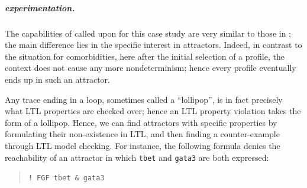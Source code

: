 \subparagraph*{\GROOVE experimentation.}

The capabilities of \GROOVE called upon for this case study are very similar to those in ; the main difference lies in the specific interest in attractors. Indeed, in contrast to the situation for comorbidities, here after the initial selection of a profile, the context does not cause any more nondeterminism; hence every profile eventually ends up in such an attractor.

Any trace ending in a loop, sometimes called a ``lollipop'', is in fact precisely what LTL properties are checked over; hence an LTL property violation takes the form of a lollipop. Hence, we can find attractors with specific properties by formulating their non-existence in LTL, and then finding a counter-example through LTL model checking. For instance, the following formula denies the reachability of an attractor in which \texttt{tbet} and \texttt{gata3} are both expressed:

\begin{quote}
\verb=! FGF tbet & gata3=
\end{quote}

